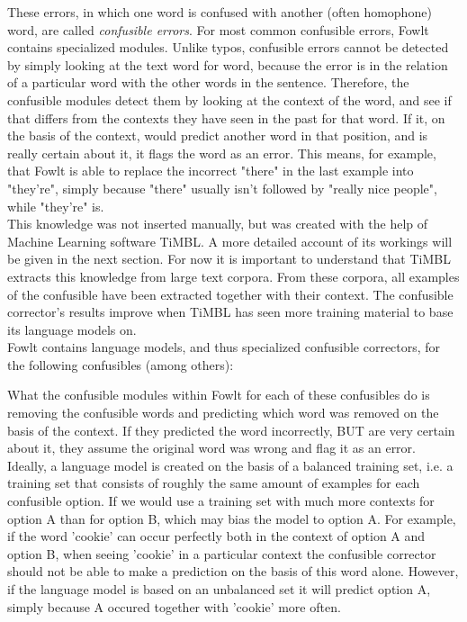 \documentclass[12pt]{article}
\begin{document}
These errors, in which one word is confused with another (often homophone) word, are called \emph{confusible errors}. For most common confusible errors, Fowlt contains specialized modules. Unlike typos, confusible errors cannot be detected by simply looking at the text word for word, because the error is in the relation of a particular word with the other words in the sentence. Therefore, the confusible modules detect them by looking at the context of the word, and see if that differs from the contexts they have seen in the past for that word. If it, on the basis of the context, would predict another word in that position, and is really certain about it, it flags the word as an error. This means, for example, that Fowlt is able to replace the incorrect "there" in the last example into "they're", simply because "there" usually isn't followed by "really nice people", while "they're" is. \\\indent
This knowledge was not inserted manually, but was created with the help of Machine Learning software TiMBL. A more detailed account of its workings will be given in the next section. For now it is important to understand that TiMBL extracts this knowledge from large text corpora. From these corpora, all examples of the confusible have been extracted together with their context. The confusible corrector's results improve when TiMBL has seen more training material to base its language models on.\\\indent
Fowlt contains language models, and thus specialized confusible correctors, for the following confusibles (among others):

What the confusible modules within Fowlt for each of these confusibles do is removing the confusible words and predicting which word was removed on the basis of the context. If they predicted the word incorrectly, BUT are very certain about it, they assume the original word was wrong and flag it as an error. \\\indent
Ideally, a language model is created on the basis of a balanced training set, i.e. a training set that consists of roughly the same amount of examples for each confusible option. If we would use a training set with much more contexts for option A than for option B, which may bias the model to option A. For example, if the word 'cookie' can occur perfectly both in the context of option A and option B, when seeing 'cookie' in a particular context the confusible corrector should not be able to make a prediction on the basis of this word alone. However, if the language model is based on an unbalanced set it will predict option A, simply because A occured together with 'cookie' more often. \\\indent
\end{document}
